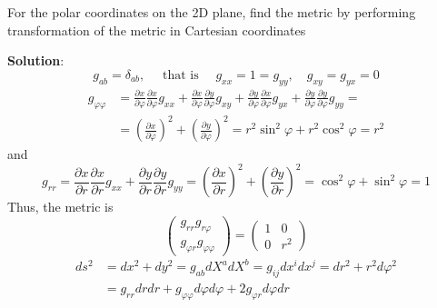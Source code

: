 \begin{example}
For the polar coordinates on the 2D plane, find the metric by performing transformation of the metric in Cartesian coordinates
\end{example}
\textbf{Solution}:
$$
g_{a b}=\delta_{a b}, \quad \text { that is } \quad g_{x x}=1=g_{y y}, \quad g_{x y}=g_{y x}=0
$$
$$
\begin{aligned}
g_{\varphi \varphi} &=\frac{\partial x}{\partial \varphi} \frac{\partial x}{\partial \varphi} g_{x x}+\frac{\partial x}{\partial \varphi} \frac{\partial y}{\partial \varphi} g_{x y}+\frac{\partial y}{\partial \varphi} \frac{\partial x}{\partial \varphi} g_{y x}+\frac{\partial y}{\partial \varphi} \frac{\partial y}{\partial \varphi} g_{y y}=\\
&=\left(\frac{\partial x}{\partial \varphi}\right)^{2}+\left(\frac{\partial y}{\partial \varphi}\right)^{2}=r^{2} \sin ^{2} \varphi+r^{2} \cos ^{2} \varphi=r^{2}
\end{aligned}
$$
and
$$
g_{r r}=\frac{\partial x}{\partial r} \frac{\partial x}{\partial r} g_{x x}+\frac{\partial y}{\partial r} \frac{\partial y}{\partial r} g_{y y}=\left(\frac{\partial x}{\partial r}\right)^{2}+\left(\frac{\partial y}{\partial r}\right)^{2}=\cos ^{2} \varphi+\sin ^{2} \varphi=1
$$
Thus, the metric is
$$
\left(\begin{array}{l}
{g_{r r} g_{r \varphi}} \\
{g_{\varphi r} g_{\varphi \varphi}}
\end{array}\right)=\left(\begin{array}{ll}
{1} & {0} \\
{0} & {r^{2}}
\end{array}\right)
$$
$$
\begin{aligned}
d s^{2} &=d x^{2}+d y^{2}=g_{a b} d X^{a} d X^{b}=g_{i j} d x^{i} d x^{j}=d r^{2}+r^{2} d \varphi^{2} \\
&=g_{r r} d r d r+g_{\varphi \varphi} d \varphi d \varphi+2 g_{\varphi r} d \varphi d r
\end{aligned}
$$
\begin{qt}
\end{qt}


